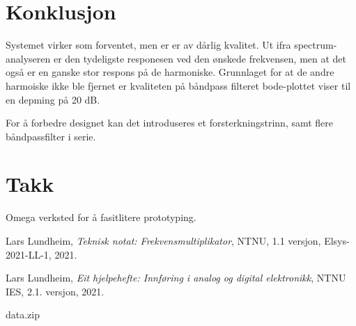 \documentclass[a4paper,11pt,norsk]{article}
\begin{document}
\section{Konklusjon}
\label{sec:konklusjon}

Systemet virker som forventet, men er er av dårlig kvalitet. Ut ifra spectrum-analyseren er den tydeligste responesen ved den ønskede frekvensen, men at det også er en ganske stor respons på de harmoniske. Grunnlaget for at de andre harmoiske ikke ble fjernet er kvaliteten på båndpass filteret bode-plottet viser til en depming på 20 dB.

For å forbedre designet kan det introduseres et forsterkningstrinn, samt flere båndpassfilter i serie.

\section{Takk}
Omega verksted for å fasitlitere prototyping.

\newpage
{}
{}
\begin{thebibliography}{99}

  Lars	Lundheim,
  \emph{Teknisk notat: Frekvensmultiplikator},
  NTNU,
  1.1 versjon,
  Elsys-2021-LL-1,
  2021.

  Lars	Lundheim,
  \emph{Eit hjelpehefte: Innføring i analog og digital elektronikk},
  NTNU IES,
  2.1. versjon,
  2021.

\end{thebibliography}

{}
\appendix
\label{sec:Vedlegg}
data.zip
\end{document}
